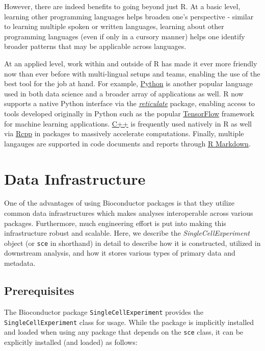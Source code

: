\documentclass[]{book}
\begin{document}
However, there are indeed benefits to going beyond just R. At a basic level, learning other programming languages helps broaden one's perspective - similar to learning multiple spoken or written languages, learning about other programming languages (even if only in a cursory manner) helps one identify broader patterns that may be applicable across languages.

At an applied level, work within and outside of R has made it ever more friendly now than ever before with multi-lingual setups and teams, enabling the use of the best tool for the job at hand. For example, \href{https://www.python.org/}{Python} is another popular language used in both data science and a broader array of applications as well. R now supports a native Python interface via the \href{https://github.com/rstudio/reticulate}{\emph{reticulate}} package, enabling access to tools developed originally in Python such as the popular \href{https://tensorflow.rstudio.com/}{TensorFlow} framework for machine learning applications. \href{http://www.cplusplus.com/}{C++} is frequently used natively in R as well via \href{http://www.rcpp.org/}{Rcpp} in packages to massively accelerate computations. Finally, multiple langauges are supported in code documents and reports through \href{https://rmarkdown.rstudio.com/lesson-5.html}{R Markdown}.

\hypertarget{data-infrastructure}{%
\chapter{Data Infrastructure}\label{data-infrastructure}}

One of the advantages of using Bioconductor packages is that they utilize common data infrastructures which makes analyses interoperable across various packages. Furthermore, much engineering effort is put into making this infrastructure robust and scalable. Here, we describe the \emph{SingleCellExperiment} object (or \texttt{sce} in shorthand) in detail to describe how it is constructed, utilized in downstream analysis, and how it stores various types of primary data and metadata.

\hypertarget{prerequisites}{%
\section{Prerequisites}\label{prerequisites}}

The Bioconductor package \texttt{SingleCellExperiment} provides the \texttt{SingleCellExperiment} class for usage. While the package is implicitly installed and loaded when using any package that depends on the \texttt{sce} class, it can be explicitly installed (and loaded) as follows:
\end{document}
